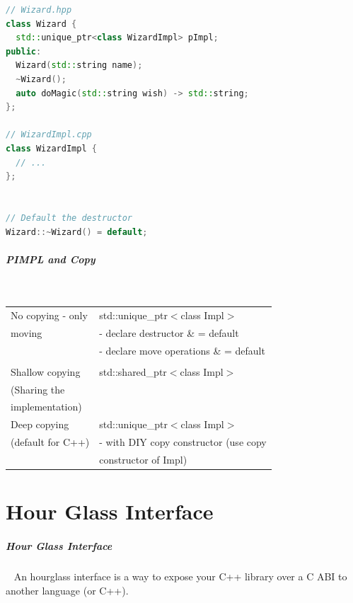 \documentclass[11pt,twoside,landscape]{article}
\begin{document}
\begin{multicols}{2}
\begin{lstlisting}[language=c++,label=lst:pimpl-using-unique_ptr,caption={PIMPL using unique\textsubscript{ptr}},captionpos=b,numbers=none]
// Wizard.hpp
class Wizard {
  std::unique_ptr<class WizardImpl> pImpl;
public:
  Wizard(std::string name);
  ~Wizard();
  auto doMagic(std::string wish) -> std::string;
};

// WizardImpl.cpp
class WizardImpl {
  // ...
};


// Default the destructor
Wizard::~Wizard() = default;
\end{lstlisting}

\subparagraph{PIMPL and Copy} \
\label{sec:org0bb49c8}
\begin{center}
\begin{tabular}{|l|l|}
\hline
No copying - only & std::unique\_ptr$<$class Impl$>$ \\
moving & - declare destructor \& = default \\
 & - declare move operations \& = default \\
 & \\
\hline
Shallow copying & std::shared\_ptr$<$class Impl$>$ \\
(Sharing the & \\
implementation) & \\
\hline
Deep copying & std::unique\_ptr$<$class Impl$>$ \\
(default for C++) & - with DIY copy constructor (use copy \\
 & constructor of Impl) \\
\hline
\end{tabular}
\end{center}

\section{Hour Glass Interface}
\label{sec:orgf7c54f1}
\subparagraph{Hour Glass Interface} \
\label{sec:org4b5441b}
An hourglass interface is a way to expose your C++ library over a C ABI to another language (or C++).



\end{multicols}
\end{document}
